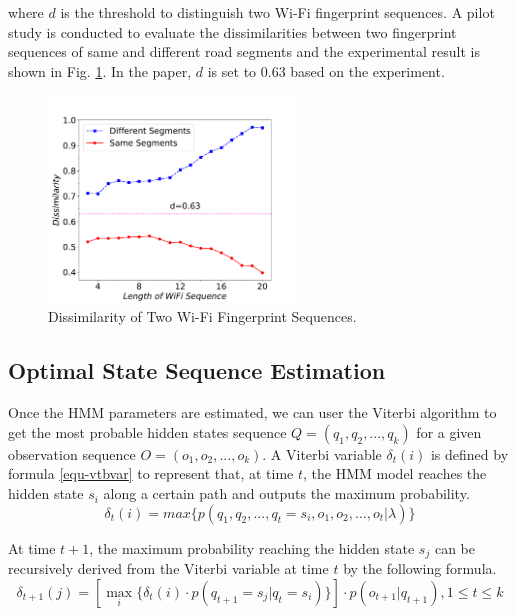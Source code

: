 \documentclass{llncs}
\begin{document}
where $d$ is the threshold to distinguish two Wi-Fi fingerprint sequences. A pilot study is conducted to evaluate the dissimilarities between two fingerprint sequences of same and different road segments and the experimental result is shown in Fig. \ref{fig-wifidist}. In the paper, $d$ is set to $0.63$ based on the experiment. 

\begin{figure}[!htbp]
	\centering
	\includegraphics[width=2.58in]{AiFiMatch-WiFiDist}
	\caption{Dissimilarity of Two Wi-Fi Fingerprint Sequences.}
	\label{fig-wifidist}
\end{figure}

\subsection{Optimal State Sequence Estimation}

Once the HMM parameters are estimated, we can user the Viterbi algorithm to get the most probable hidden states sequence $Q = ({q_1},{q_2},...,{q_k})$ for a given observation sequence $O = ({o_1},{o_2},...,{o_k})$. A Viterbi variable ${\delta _t}(i)$ is defined by formula \ref{equ-vtbvar} to represent that, at time $t$, the HMM model reaches the hidden state $s_i$ along a certain path and outputs the maximum probability.
\begin{equation}
	\label{equ-vtbvar}
	{\delta _t}(i) = max\{ p({q_1},{q_2},...,{q_t} = {s_i},{o_1},{o_2},...,{o_t}|\lambda )\}
\end{equation}

At time $t+1$, the maximum probability reaching the hidden state $s_j$ can be recursively derived from the Viterbi variable at time $t$ by the following formula. 
\begin{equation}
	{\delta _{t + 1}}(j) = [\mathop {max}\limits_i \{ {\delta _t}(i) \cdot p({q_{t + 1}} = {s_j}|{q_t} = {s_i})\} ] \cdot p({o_{t + 1}}|{q_{t + 1}}),1 \le t \le k
\end{equation}
\end{document}
